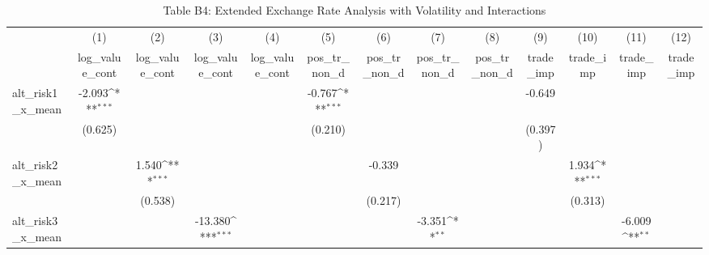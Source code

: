 \begin{table}[htbp]\centering
\def\sym#1{\ifmmode^{#1}\else\(^{#1}\)\fi}
\caption{Table B4: Extended Exchange Rate Analysis with Volatility and Interactions}
\begin{tabular}{l*{12}{c}}
\hline\hline
            &\multicolumn{1}{c}{(1)}&\multicolumn{1}{c}{(2)}&\multicolumn{1}{c}{(3)}&\multicolumn{1}{c}{(4)}&\multicolumn{1}{c}{(5)}&\multicolumn{1}{c}{(6)}&\multicolumn{1}{c}{(7)}&\multicolumn{1}{c}{(8)}&\multicolumn{1}{c}{(9)}&\multicolumn{1}{c}{(10)}&\multicolumn{1}{c}{(11)}&\multicolumn{1}{c}{(12)}\\
            &\multicolumn{1}{c}{log\_value\_cont}&\multicolumn{1}{c}{log\_value\_cont}&\multicolumn{1}{c}{log\_value\_cont}&\multicolumn{1}{c}{log\_value\_cont}&\multicolumn{1}{c}{pos\_tr\_non\_d}&\multicolumn{1}{c}{pos\_tr\_non\_d}&\multicolumn{1}{c}{pos\_tr\_non\_d}&\multicolumn{1}{c}{pos\_tr\_non\_d}&\multicolumn{1}{c}{trade\_imp}&\multicolumn{1}{c}{trade\_imp}&\multicolumn{1}{c}{trade\_imp}&\multicolumn{1}{c}{trade\_imp}\\
\hline
alt\_risk1\_x\_mean&      -2.093\sym{***}&                     &                     &                     &      -0.767\sym{***}&                     &                     &                     &      -0.649         &                     &                     &                     \\
            &     (0.625)         &                     &                     &                     &     (0.210)         &                     &                     &                     &     (0.397)         &                     &                     &                     \\
[1em]
alt\_risk2\_x\_mean&                     &       1.540\sym{***}&                     &                     &                     &      -0.339         &                     &                     &                     &       1.934\sym{***}&                     &                     \\
            &                     &     (0.538)         &                     &                     &                     &     (0.217)         &                     &                     &                     &     (0.313)         &                     &                     \\
[1em]
alt\_risk3\_x\_mean&                     &                     &     -13.380\sym{***}&                     &                     &                     &      -3.351\sym{**} &                     &                     &                     &      -6.009\sym{**} &                     \\

\end{tabular}
\end{table}

